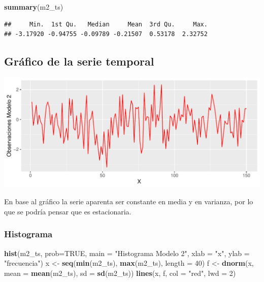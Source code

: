 \documentclass[
  11pt,
]{article}
\newenvironment{Shaded}{\begin{snugshade}}{\end{snugshade}}
\newcommand{\DataTypeTok}[1]{\textcolor[rgb]{0.13,0.29,0.53}{#1}}
\newcommand{\DecValTok}[1]{\textcolor[rgb]{0.00,0.00,0.81}{#1}}
\newcommand{\KeywordTok}[1]{\textcolor[rgb]{0.13,0.29,0.53}{\textbf{#1}}}
\newcommand{\NormalTok}[1]{#1}
\newcommand{\OtherTok}[1]{\textcolor[rgb]{0.56,0.35,0.01}{#1}}
\newcommand{\StringTok}[1]{\textcolor[rgb]{0.31,0.60,0.02}{#1}}
\begin{document}
\begin{Shaded}
\begin{Highlighting}[]
\KeywordTok{summary}\NormalTok{(m2_ts)}
\end{Highlighting}
\end{Shaded}

\begin{verbatim}
##     Min.  1st Qu.   Median     Mean  3rd Qu.     Max. 
## -3.17920 -0.94755 -0.09789 -0.21507  0.53178  2.32752
\end{verbatim}

\hypertarget{gruxe1fico-de-la-serie-temporal}{%
\subsection{Gráfico de la serie
temporal}\label{gruxe1fico-de-la-serie-temporal}}

\begin{center}\includegraphics[width=0.9\linewidth]{RmdFigs/plot_ts2-1} \end{center}

En base al gráfico la serie aparenta ser constante en media y en
varianza, por lo que se podría pensar que es estacionaria.

\hypertarget{histograma}{%
\subsubsection{Histograma}\label{histograma}}

\begin{Shaded}
\begin{Highlighting}[]
\KeywordTok{hist}\NormalTok{(m2_ts, }\DataTypeTok{prob=}\OtherTok{TRUE}\NormalTok{, }\DataTypeTok{main =} \StringTok{"Histograma Modelo 2"}\NormalTok{, }\DataTypeTok{xlab =} \StringTok{"x"}\NormalTok{, }\DataTypeTok{ylab =} \StringTok{"frecuencia"}\NormalTok{)}
\NormalTok{x <-}\StringTok{ }\KeywordTok{seq}\NormalTok{(}\KeywordTok{min}\NormalTok{(m2_ts), }\KeywordTok{max}\NormalTok{(m2_ts), }\DataTypeTok{length =} \DecValTok{40}\NormalTok{)}
\NormalTok{f <-}\StringTok{ }\KeywordTok{dnorm}\NormalTok{(x, }\DataTypeTok{mean =} \KeywordTok{mean}\NormalTok{(m2_ts), }\DataTypeTok{sd =} \KeywordTok{sd}\NormalTok{(m2_ts))}
\KeywordTok{lines}\NormalTok{(x, f, }\DataTypeTok{col =} \StringTok{"red"}\NormalTok{, }\DataTypeTok{lwd =} \DecValTok{2}\NormalTok{)}
\end{Highlighting}
\end{Shaded}
\end{document}
